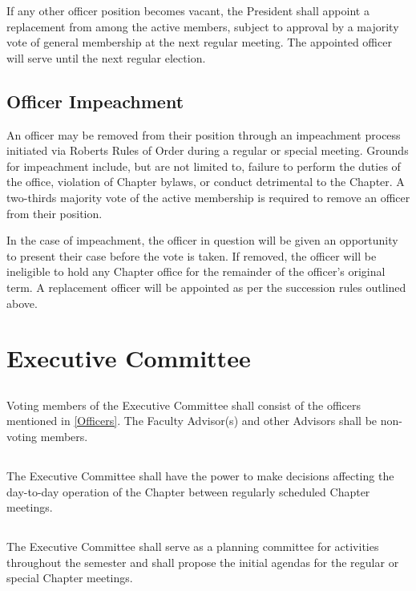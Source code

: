 \documentclass[10pt, oneside]{article}
\begin{document}
If any other officer position becomes vacant, the President shall appoint a replacement from among the active members, subject to approval by a majority vote of general membership at the next regular meeting. The appointed officer will serve until the next regular election.

\subsection{Officer Impeachment}

An officer may be removed from their position through an impeachment process initiated via Roberts Rules of Order during a regular or special meeting. Grounds for impeachment include, but are not limited to, failure to perform the duties of the office, violation of Chapter bylaws, or conduct detrimental to the Chapter. A two-thirds majority vote of the active membership is required to remove an officer from their position. 

In the case of impeachment, the officer in question will be given an opportunity to present their case before the vote is taken. If removed, the officer will be ineligible to hold any Chapter office for the remainder of the officer's original term. A replacement officer will be appointed as per the succession rules outlined above.

\section{Executive Committee}
\subsection{}
Voting members of the Executive Committee shall consist of the officers mentioned in \ref{Officers}. The Faculty Advisor(s) and other Advisors shall be non-voting members.

\subsection{}
The Executive Committee shall have the power to make decisions affecting the day-to-day operation of the Chapter between regularly scheduled Chapter meetings.

\subsection{}
The Executive Committee shall serve as a planning committee for activities throughout the semester and shall propose the initial agendas for the regular or special Chapter meetings.
\end{document}
